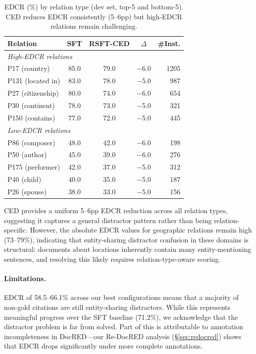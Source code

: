 \documentclass[11pt,a4paper]{article}
\begin{document}
\begin{table}[t]
\centering
\small
\begin{tabular}{lcccr}
\toprule
\textbf{Relation} & \textbf{SFT} & \textbf{RSFT-CED} & $\Delta$ & \textbf{\#Inst.} \\
\midrule
\multicolumn{5}{l}{\emph{High-EDCR relations}} \\
P17 (country) & 85.0 & 79.0 & $-$6.0 & 1205 \\
P131 (located in) & 83.0 & 78.0 & $-$5.0 & 987 \\
P27 (citizenship) & 80.0 & 74.0 & $-$6.0 & 654 \\
P30 (continent) & 78.0 & 73.0 & $-$5.0 & 321 \\
P150 (contains) & 77.0 & 72.0 & $-$5.0 & 445 \\
\midrule
\multicolumn{5}{l}{\emph{Low-EDCR relations}} \\
P86 (composer) & 48.0 & 42.0 & $-$6.0 & 198 \\
P50 (author) & 45.0 & 39.0 & $-$6.0 & 276 \\
P175 (performer) & 42.0 & 37.0 & $-$5.0 & 312 \\
P40 (child) & 40.0 & 35.0 & $-$5.0 & 187 \\
P26 (spouse) & 38.0 & 33.0 & $-$5.0 & 156 \\
\bottomrule
\end{tabular}
\caption{EDCR (\%) by relation type (dev set, top-5 and bottom-5). CED reduces EDCR consistently (5--6pp) but high-EDCR relations remain challenging.}
\label{tab:edcr_rel}
\end{table}

CED provides a uniform 5--6pp EDCR reduction across all relation types, suggesting it captures a general distractor pattern rather than being relation-specific. However, the absolute EDCR values for geographic relations remain high (73--79\%), indicating that entity-sharing distractor confusion in these domains is structural: documents about locations inherently contain many entity-mentioning sentences, and resolving this likely requires relation-type-aware scoring.

\paragraph{Limitations.} EDCR of 58.5--66.1\% across our best configurations means that a majority of non-gold citations are still entity-sharing distractors. While this represents meaningful progress over the SFT baseline (71.2\%), we acknowledge that the distractor problem is far from solved. Part of this is attributable to annotation incompleteness in DocRED---our Re-DocRED analysis (\S\ref{sec:redocred}) shows that EDCR drops significantly under more complete annotations.
\end{document}
